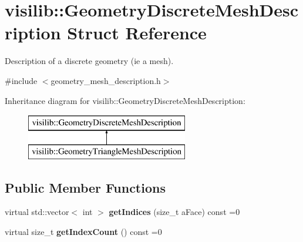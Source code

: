 \hypertarget{structvisilib_1_1_geometry_discrete_mesh_description}{}\section{visilib\+::Geometry\+Discrete\+Mesh\+Description Struct Reference}
\label{structvisilib_1_1_geometry_discrete_mesh_description}


Description of a discrete geometry (ie a mesh).  




{\ttfamily \#include $<$geometry\+\_\+mesh\+\_\+description.\+h$>$}

Inheritance diagram for visilib\+::Geometry\+Discrete\+Mesh\+Description\+:\begin{figure}[H]
\begin{center}
\leavevmode
\includegraphics[height=2.000000cm]{structvisilib_1_1_geometry_discrete_mesh_description}
\end{center}
\end{figure}
\subsection*{Public Member Functions}
\begin{DoxyCompactItemize}
\item 
\mbox{\label{structvisilib_1_1_geometry_discrete_mesh_description_a3c6788bb2758cbb7bb75827c0e9dd14f}} 
virtual std\+::vector$<$ int $>$ {\bfseries get\+Indices} (size\+\_\+t a\+Face) const =0
\item 
\mbox{\label{structvisilib_1_1_geometry_discrete_mesh_description_aa15955c8ac869f807470083b065beb7d}} 
virtual size\+\_\+t {\bfseries get\+Index\+Count} () const =0
\end{DoxyCompactItemize}
